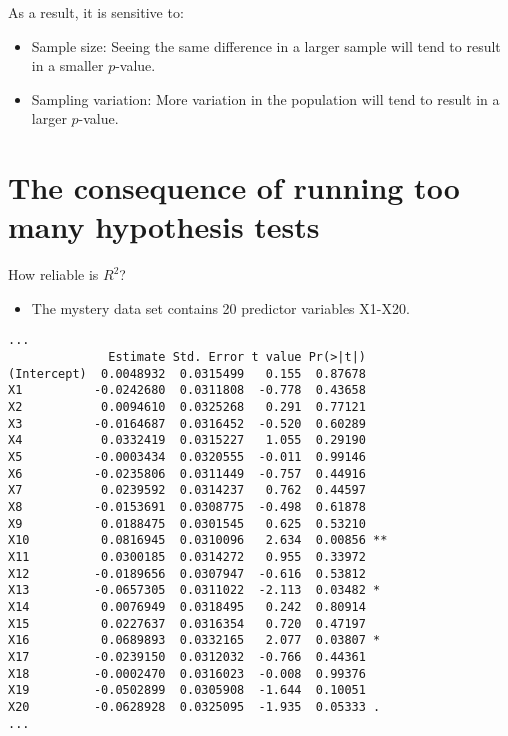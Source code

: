 \documentclass{beamer}\usepackage[]{graphicx}\usepackage[]{color}
\makeatletter
\newenvironment{kframe}{%
 \def\at@end@of@kframe{}%
 \ifinner\ifhmode%
  \def\at@end@of@kframe{\end{minipage}}%
  \begin{minipage}{\columnwidth}%
 \fi\fi%
 \def\FrameCommand##1{\hskip\@totalleftmargin \hskip-\fboxsep
 \colorbox{shadecolor}{##1}\hskip-\fboxsep
     \hskip-\linewidth \hskip-\@totalleftmargin \hskip\columnwidth}%
 \MakeFramed {\advance\hsize-\width
   \@totalleftmargin\z@ \linewidth\hsize
   \@setminipage}}%
 {\par\unskip\endMakeFramed%
 \at@end@of@kframe}
\newenvironment{knitrout}{}{} %
\makeatother
\begin{document}
\begin{darkframes}
\begin{frame}
      \bigskip

      As a result, it is sensitive to:
      \begin{itemize}
        \item \alert{Sample size}: Seeing the same difference in a larger sample will tend to result in a smaller $p$-value.
        \item \alert{Sampling variation}: More variation in the population will tend to result in a larger $p$-value.
      \end{itemize}
    \end{frame}

    \section{The consequence of running too many hypothesis tests}

    \begin{frame}
    \end{frame}

    \begin{frame}{How reliable is $R^2$?}
      \begin{itemize}[<+->]
        \item The mystery data set contains 20 predictor variables X1-X20.
      \end{itemize}
    \end{frame}

    \begin{frame}[fragile]
      \fontvsm
\begin{knitrout}
\color{fgcolor}\begin{kframe}
\begin{verbatim}
...
              Estimate Std. Error t value Pr(>|t|)   
(Intercept)  0.0048932  0.0315499   0.155  0.87678   
X1          -0.0242680  0.0311808  -0.778  0.43658   
X2           0.0094610  0.0325268   0.291  0.77121   
X3          -0.0164687  0.0316452  -0.520  0.60289   
X4           0.0332419  0.0315227   1.055  0.29190   
X5          -0.0003434  0.0320555  -0.011  0.99146   
X6          -0.0235806  0.0311449  -0.757  0.44916   
X7           0.0239592  0.0314237   0.762  0.44597   
X8          -0.0153691  0.0308775  -0.498  0.61878   
X9           0.0188475  0.0301545   0.625  0.53210   
X10          0.0816945  0.0310096   2.634  0.00856 **
X11          0.0300185  0.0314272   0.955  0.33972   
X12         -0.0189656  0.0307947  -0.616  0.53812   
X13         -0.0657305  0.0311022  -2.113  0.03482 * 
X14          0.0076949  0.0318495   0.242  0.80914   
X15          0.0227637  0.0316354   0.720  0.47197   
X16          0.0689893  0.0332165   2.077  0.03807 * 
X17         -0.0239150  0.0312032  -0.766  0.44361   
X18         -0.0002470  0.0316023  -0.008  0.99376   
X19         -0.0502899  0.0305908  -1.644  0.10051   
X20         -0.0628928  0.0325095  -1.935  0.05333 . 
...


\end{verbatim}
\end{kframe}
\end{knitrout}
\end{frame}
\end{darkframes}
\end{document}
